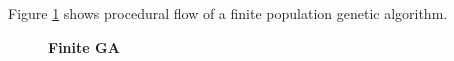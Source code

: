Figure \ref{FiniteGA} shows procedural flow of a finite population genetic algorithm.
\begin{figure}[H]
\begin{center}
\hspace{4pt}
\caption{\textbf{Finite GA} }
\label{FiniteGA}
\end{center}
\end{figure}

